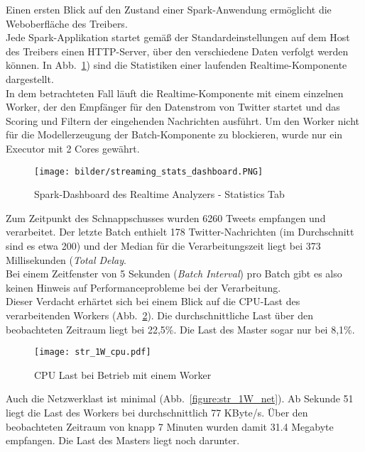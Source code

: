 Einen ersten Blick auf den Zustand einer Spark-Anwendung ermöglicht die Weboberfläche des Treibers.\\

Jede Spark-Applikation startet gemäß der Standardeinstellungen auf dem Host des Treibers einen HTTP-Server, über den verschiedene Daten verfolgt werden können. In Abb.~\ref{figure:realtime_dashboard_stats}) sind die Statistiken einer laufenden Realtime-Komponente dargestellt.\\

In dem betrachteten Fall läuft die Realtime-Komponente mit einem einzelnen Worker, der den Empfänger für den Datenstrom von Twitter startet und das Scoring und Filtern der eingehenden Nachrichten ausführt. Um den Worker nicht für die Modellerzeugung der Batch-Komponente zu blockieren, wurde nur ein Executor mit 2 Cores gewährt.

\begin{figure}[ht!]
	\centering
	\texttt{[image: bilder/streaming\_stats\_dashboard.PNG]}
	\caption{Spark-Dashboard des Realtime Analyzers - Statistics Tab}
	\label{figure:realtime_dashboard_stats}
\end{figure}

Zum Zeitpunkt des Schnappschusses wurden 6260 Tweets empfangen und verarbeitet. Der letzte Batch enthielt 178 Twitter-Nachrichten (im Durchschnitt sind es etwa 200) und der Median für die Verarbeitungszeit liegt bei 373 Millisekunden (\textit{Total Delay}.\\

Bei einem Zeitfenster von 5 Sekunden (\textit{Batch Interval}) pro Batch gibt es also keinen Hinweis auf Performanceprobleme bei der Verarbeitung.\\

Dieser Verdacht erhärtet sich bei einem Blick auf die CPU-Last des verarbeitenden Workers (Abb.~\ref{figure:str_1W_cpu}). Die durchschnittliche Last über den beobachteten Zeitraum liegt bei 22,5\%. Die Last des Master sogar nur bei 8,1\%.

\begin{figure}[ht!]
	\centering
	\texttt{[image: str\_1W\_cpu.pdf]}
	\caption{CPU Last bei Betrieb mit einem Worker}
	\label{figure:str_1W_cpu}
\end{figure}

Auch die Netzwerklast ist minimal (Abb.~\ref{figure:str_1W_net}). Ab Sekunde 51 liegt die Last des Workers bei durchschnittlich 77 KByte/s. Über den beobachteten Zeitraum von knapp 7 Minuten wurden damit 31.4 Megabyte empfangen. Die Last des Masters liegt noch darunter.

